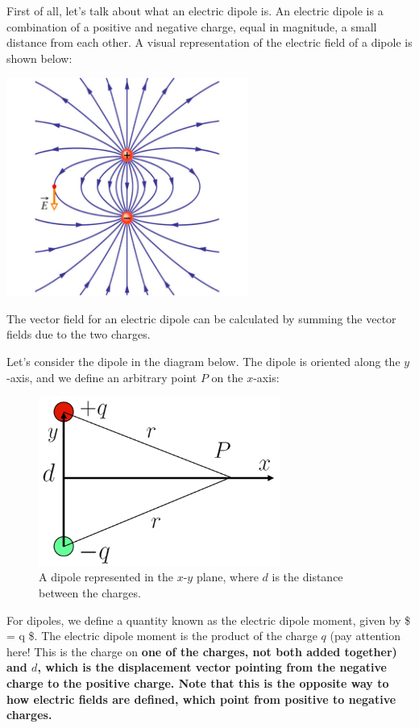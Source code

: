 \documentclass[
  letterpaper,
  DIV=11,
  numbers=noendperiod]{scrreprt}
\begin{document}
First of all, let's talk about what an electric dipole is. An electric
dipole is a combination of a positive and negative charge, equal in
magnitude, a small distance from each other. A visual representation of
the electric field of a dipole is shown below:

\includegraphics[width=3.125in,height=\textheight]{Figures/dipole_field.png}

The vector field for an electric dipole can be calculated by summing the
vector fields due to the two charges.

Let's consider the dipole in the diagram below. The dipole is oriented
along the \(y\)-axis, and we define an arbitrary point \(P\) on the
\(x\)-axis:

\begin{figure}[H]

{\centering \includegraphics[width=3.125in,height=\textheight]{Figures/dipole_diagram.png}

}

\caption{A dipole represented in the \(x\)-\(y\) plane, where \(d\) is
the distance between the charges.}

\end{figure}%

For dipoles, we define a quantity known as the electric dipole moment,
given by \$ = q  \$. The electric
dipole moment is the product of the charge \(q\) (pay attention here!
This is the charge on
\bf{one of} the charges, not both added together) and $d$, which is the displacement vector pointing from the negative charge to the positive charge. Note that this is the opposite way to how electric fields are defined, which point from positive to negative charges.  
\end{document}
